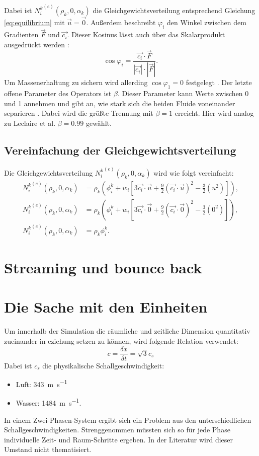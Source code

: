 \documentclass[a4paper,10pt]{scrreprt}
\begin{document}
Dabei ist ${N_i^k}^{(e)} (\rho_k,0,\alpha_k)$ die Gleichgewichtsverteilung entsprechend Gleichung \eqref{eq:equilibrium} mit $\vec{u} = \vec{0}$. 
Außerdem beschreibt $\varphi_i$ den Winkel zwischen dem Gradienten $\vec{F}$ und $\vec{c_i}.$
Dieser Kosinus lässt auch über das Skalarprodukt ausgedrückt werden \cite{Bronstein2006}:
\begin{equation}
 \cos{\varphi_i} = \frac{\vec{c_i} \cdot \vec{F}}{|\vec{c_i}| \cdot |\vec{F}|}.
\end{equation}
Um Massenerhaltung zu sichern wird allerding $\cos{\varphi_1} = 0$ festgelegt \cite{Leclaire2011}.
Der letzte offene Parameter des Operators ist $\beta$. Dieser Parameter kann Werte zwischen 0 und 1 annehmen und gibt an, wie stark sich die beiden Fluide voneinander separieren \cite{Latva-Kokko2005}.
Dabei wird die größte Trennung mit $\beta = 1$ erreicht. 
Hier wird analog zu Leclaire et al. $\beta = \num{0.99}$ gewählt. 
\subsection{Vereinfachung der Gleichgewichtsverteilung}
Die Gleichgewichtsverteilung ${N_i^k}^{(e)} (\rho_k,0,\alpha_k)$ wird wie folgt vereinfacht:
\begin{align}
 {N_i^k}^{(e)} (\rho_k,0,\alpha_k) &= \rho_k \left( \phi_i^k + w_i \left[3 \vec{c_i} \cdot \vec{u} + \frac{9}{2} (\vec{c_i} \cdot \vec{u})^2 - \frac{3}{2} (u^2) \right]  \right), \\
 {N_i^k}^{(e)} (\rho_k,0,\alpha_k) &= \rho_k \left( \phi_i^k + w_i \left[3 \vec{c_i} \cdot \vec{0} + \frac{9}{2} (\vec{c_i} \cdot \vec{0})^2 - \frac{3}{2} (0^2) \right]  \right), \\
{N_i^k}^{(e)} (\rho_k,0,\alpha_k) &= \rho_k \phi_i^k.
\end{align}


\section{Streaming und bounce back}


\section{Die Sache mit den Einheiten}
Um innerhalb der Simulation die räumliche und zeitliche Dimension quantitativ zueinander in eziehung setzen zu können, wird folgende Relation verwendet:
\begin{equation}
 c = \frac{\delta x}{\delta t} = \sqrt{3} c_s
\end{equation}
Dabei ist $c_s$ die physikalische Schallgeschwindigkeit:
\begin{itemize}
 \item Luft: \SI{343}{\metre \per \second}
 \item Wasser: \SI{1484}{\metre \per \second}.
\end{itemize}
In einem Zwei-Phasen-System ergibt sich ein Problem aus den unterschiedlichen Schallgeschwindigkeiten. 
Strenggenommen müssten sich so für jede Phase individuelle Zeit- und Raum-Schritte ergeben. 
In der Literatur wird dieser Umstand nicht thematisiert. 
\end{document}
